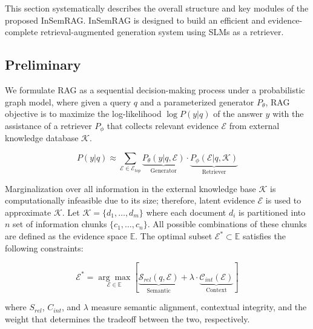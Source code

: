 This section systematically describes the overall structure and key modules of the proposed InSemRAG.
InSemRAG is designed to build an efficient and evidence-complete retrieval-augmented generation system using SLMs as a retriever.

\subsection{Preliminary}
We formulate RAG as a sequential decision-making process under a probabilistic graph model, where given a query $q$ and a parameterized generator $P_\theta$, RAG objective is to maximize the log-likelihood $\log P(y|q)$ of the answer $y$ with the assistance of a retriever $P_\phi$ that collects relevant evidence $\mathcal{E}$ from external knowledge database $\mathcal{K}$. 

\begin{equation}
  P(y|q) \approx \sum_{\mathcal{E} \in \mathcal{E}_{top}} \underbrace{P_{\theta}(y|q, \mathcal{E})}_{\text{Generator}} \cdot \underbrace{P_{\phi}(\mathcal{E}|q, \mathcal{K})}_{\text{Retriever}}
\end{equation}

\noindent
Marginalization over all information in the external knowledge base $\mathcal{K}$ is computationally infeasible due to its size; therefore, latent evidence $\mathcal{E}$ is used to approximate $\mathcal{K}$.
Let $\mathcal{K} = \{d_1, \dots, d_m\}$ where each document $d_i$ is partitioned into $n$ set of information chunks $\{c_{1}, \dots, c_{n}\}$.
All possible combinations of these chunks are defined as the evidence space $\mathbb{E}$.
The optimal subset $\mathcal{E}^* \subset \mathbb{E}$ satisfies the following constraints:

\begin{equation}\label{eq:optimal}
\mathcal{E}^* = \underset{\mathcal{E} \in \mathbb{E}}{\arg\max} \left[ \underbrace{\mathcal{S}_{rel}(q, \mathcal{E})}_{\text{Semantic}} + \lambda \cdot \underbrace{\mathcal{C}_{int}(\mathcal{E})}_{\text{Context}} \right]
\end{equation}

\noindent
where $S_{rel}$, $C_{int}$, and $\lambda$ measure semantic alignment, contextual integrity, and the weight that determines the tradeoff between the two, respectively.



